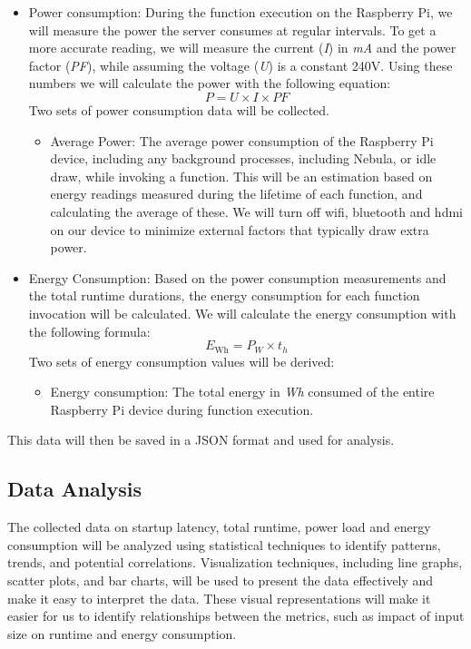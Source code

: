 \documentclass[
  table]{report}
\providecommand{\tightlist}{%
  \setlength{\itemsep}{0pt}\setlength{\parskip}{0pt}}
\begin{document}
\begin{itemize}
\item
  Power consumption: During the function execution on the Raspberry Pi,
  we will measure the power the server consumes at regular intervals. To
  get a more accurate reading, we will measure the current (\emph{I}) in
  \emph{mA} and the power factor (\emph{PF}), while assuming the voltage
  (\emph{U}) is a constant 240V. Using these numbers we will calculate
  the power with the following equation: \[P = U \times I \times
  PF\] Two sets of power consumption data will be collected.

  \begin{itemize}
  \tightlist
  \item
    Average Power: The average power consumption of the Raspberry Pi
    device, including any background processes, including Nebula, or
    idle draw, while invoking a function. This will be an estimation
    based on energy readings measured during the lifetime of each
    function, and calculating the average of these. We will turn off
    wifi, bluetooth and hdmi on our device to minimize external factors
    that typically draw extra power.
  \end{itemize}
\item
  Energy Consumption: Based on the power consumption measurements and
  the total runtime durations, the energy consumption for each function
  invocation will be calculated. We will calculate the energy
  consumption with the following formula:
  \[E_{\text{Wh}} = P_W \times t_h\] Two sets of energy consumption
  values will be derived:

  \begin{itemize}
  \tightlist
  \item
    Energy consumption: The total energy in \emph{Wh} consumed of the
    entire Raspberry Pi device during function execution.
  \end{itemize}
\end{itemize}

This data will then be saved in a JSON format and used for analysis.

\subsection{Data Analysis}
\label{sect:data_anal}

The collected data on startup latency, total runtime, power load and
energy consumption will be analyzed using statistical techniques to
identify patterns, trends, and potential correlations. Visualization
techniques, including line graphs, scatter plots, and bar charts, will
be used to present the data effectively and make it easy to interpret
the data. These visual representations will make it easier for us to
identify relationships between the metrics, such as impact of input size
on runtime and energy consumption.
\end{document}
